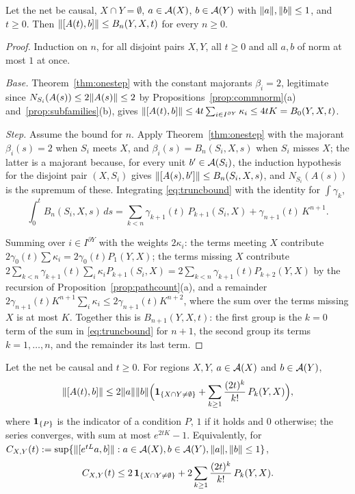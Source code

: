 \begin{theorem}[iteration]\label{thm:iteration}
Let the net be causal, $X\cap Y=\emptyset$, $a\in\mathcal A(X)$, $b\in\mathcal A(Y)$ with
$\lVert a\rVert,\lVert b\rVert\le1$, and $t\ge0$.
Then $\lVert [A(t),b]\rVert\le B_n(Y,X,t)$ for every $n\ge0$.
\end{theorem}

\begin{proof}
Induction on $n$, for all disjoint pairs $X,Y$, all $t\ge0$ and all $a,b$ of norm at most $1$
at once.

\emph{Base.} Theorem~\ref{thm:onestep} with the constant majorants $\beta_i=2$, legitimate since
$N_{S_i}(A(s))\le2\lVert A(s)\rVert\le2$ by Propositions~\ref{prop:commnorm}(a)
and~\ref{prop:subfamilies}(b), gives $\lVert [A(t),b]\rVert\le4t\sum_{i\in I^{\partial Y}}\kappa_i\le4tK
=B_0(Y,X,t)$.

\emph{Step.} Assume the bound for $n$. Apply Theorem~\ref{thm:onestep} with the majorant
$\beta_i(s)=2$ when $S_i$ meets $X$, and $\beta_i(s)=B_n(S_i,X,s)$ when $S_i$ misses $X$; the
latter is
a majorant because, for every unit $b'\in\mathcal A(S_i)$, the induction hypothesis for the disjoint
pair $(X,S_i)$ gives $\lVert [A(s),b']\rVert\le B_n(S_i,X,s)$, and $N_{S_i}(A(s))$ is the
supremum of these. Integrating \eqref{eq:truncbound} with the identity for $\int\gamma_k$,
\[
  \int_0^tB_n(S_i,X,s)\,ds=\sum_{k<n}\gamma_{k+1}(t)\,P_{k+1}(S_i,X)+\gamma_{n+1}(t)\,K^{n+1}.
\]

Summing over $i\in I^{\partial Y}$ with the weights $2\kappa_i$: the terms meeting $X$ contribute
$2\gamma_0(t)\sum\kappa_i=2\gamma_0(t)P_1(Y,X)$; the terms missing $X$ contribute
$2\sum_{k<n}\gamma_{k+1}(t)\sum_i\kappa_iP_{k+1}(S_i,X)=2\sum_{k<n}\gamma_{k+1}(t)P_{k+2}(Y,X)$ by
the recursion of Proposition~\ref{prop:pathcount}(a), and a remainder
$2\gamma_{n+1}(t)K^{n+1}\sum_i\kappa_i\le2\gamma_{n+1}(t)K^{n+2}$, where the sum over the terms
missing $X$ is at most $K$. Together this is $B_{n+1}(Y,X,t)$: the first group is the $k=0$
term of the sum in \eqref{eq:truncbound} for $n+1$, the second group its terms $k=1,\dots,n$,
and the remainder its last term.
\end{proof}

\begin{theorem}\label{thm:master}
Let the net be causal and $t\ge0$. For regions $X,Y$, $a\in\mathcal A(X)$ and $b\in\mathcal A(Y)$,
\begin{equation}\label{eq:master}
  \lVert [A(t),b]\rVert\le2\lVert a\rVert\lVert b\rVert\Bigl(\mathbf 1_{\{X\cap Y\ne\emptyset\}}
  +\sum_{k\ge1}\frac{(2t)^k}{k!}\,P_k(Y,X)\Bigr),
\end{equation}
where $\mathbf 1_{\{P\}}$ is the indicator of a condition $P$, $1$ if it holds and $0$ otherwise; the series converges, with
sum at most $e^{2tK}-1$. Equivalently, for
$C_{X,Y}(t):=\sup\{\lVert [e^{tL}a,b]\rVert:a\in\mathcal A(X),b\in\mathcal A(Y),\lVert a\rVert,\lVert b\rVert\le1\}$,
\[
  C_{X,Y}(t)\le2\,\mathbf 1_{\{X\cap Y\ne\emptyset\}}+2\sum_{k\ge1}\frac{(2t)^k}{k!}\,P_k(Y,X).
\]
\end{theorem}

